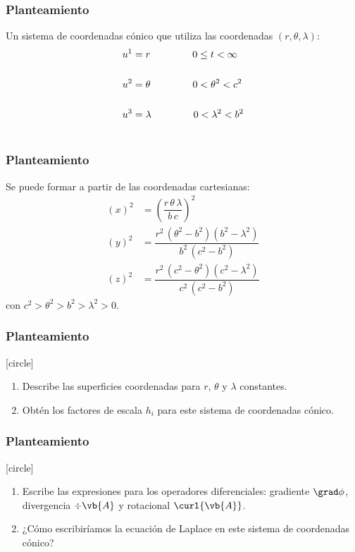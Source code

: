 \begin{frame}
\frametitle{Planteamiento}
Un sistema de coordenadas cónico que utiliza las coordenadas $(r, \theta, \lambda)$:
\begin{align*}
u^{1} &= r \hspace{1.5cm} 0 \leq t < \infty \\[0.5cm]
u^{2} &= \theta \hspace{1.5cm} 0 < \theta^{2} < c^{2} \\[0.5cm]
u^{3} &= \lambda \hspace{1.5cm} 0 < \lambda^{2} < b^{2} \\[0.5cm]
\end{align*}
\end{frame}
\begin{frame}
\frametitle{Planteamiento}
Se puede formar a partir de las coordenadas cartesianas:
\begin{align*}
(x)^{2} &= \left( \dfrac{r \, \theta \, \lambda}{b \, c} \right)^{2} \\[0.5em]
(y)^{2} &= \dfrac{r^{2} \, (\theta^{2} - b^{2})(b^{2} - \lambda^{2})}{b^{2} \, (c^{2} - b^{2})} \\[0.5em]
(z)^{2} &= \dfrac{r^{2} \, (c^{2} - \theta^{2})(c^{2} - \lambda^{2})}{c^{2} \, (c^{2} - b^{2})}
\end{align*}
con $c^{2} > \theta^{2} > b^{2} > \lambda^{2} > 0$.
\end{frame}
\begin{frame}
\frametitle{Planteamiento}
[circle]
\begin{enumerate}[<+->]
\item Describe las superficies coordenadas para $r$, $\theta$ y $\lambda$ constantes.
\item Obtén los factores de escala $h_{i}$ para este sistema de coordenadas cónico.
\seti
\end{enumerate}
\end{frame}
\begin{frame}
\frametitle{Planteamiento}
[circle]
\begin{enumerate}[<+->]
\conti
\item Escribe las expresiones para los operadores diferenciales: gradiente $\grad \phi$, divergencia $\div{\vb{A}}$ y rotacional $\curl{\vb{A}}$.
\item ¿Cómo escribiríamos la ecuación de Laplace en este sistema de coordenadas cónico?
\end{enumerate}
\end{frame}

